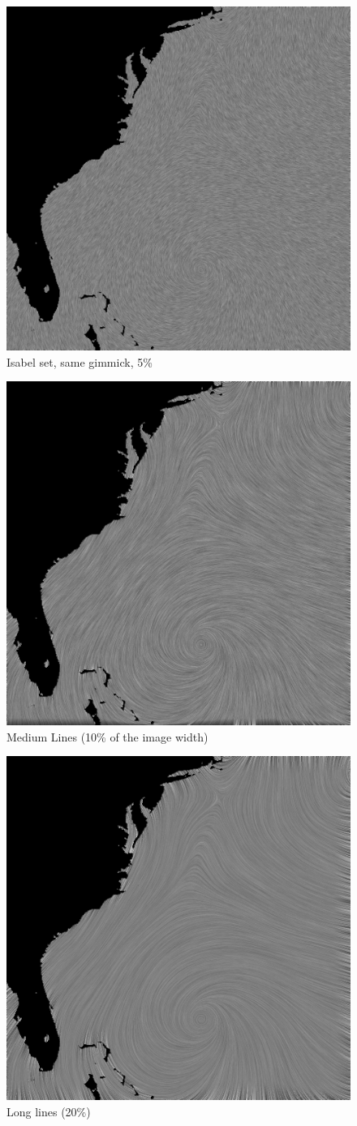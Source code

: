 \documentclass[a4paper,10pt]{report}
\begin{document}
\begin{figure}\centering
 \includegraphics[width=0.7\linewidth]{isabel_linelength_10_highdef.jpg}
 \caption{Isabel set, same gimmick, 5\%}
 \label{fig11}
\end{figure}
\begin{figure}\centering
 \includegraphics[width=0.7\linewidth]{isabel_linelength_20_highdef.jpg}
 \caption{Medium Lines (10\% of the image width)}
 \label{fig12}
\end{figure}
\begin{figure}\centering
 \includegraphics[width=0.7\linewidth]{isabel_linelength_50}
 \caption{Long lines (20\%)}
 \label{fig13}
\end{figure}
\end{document}
